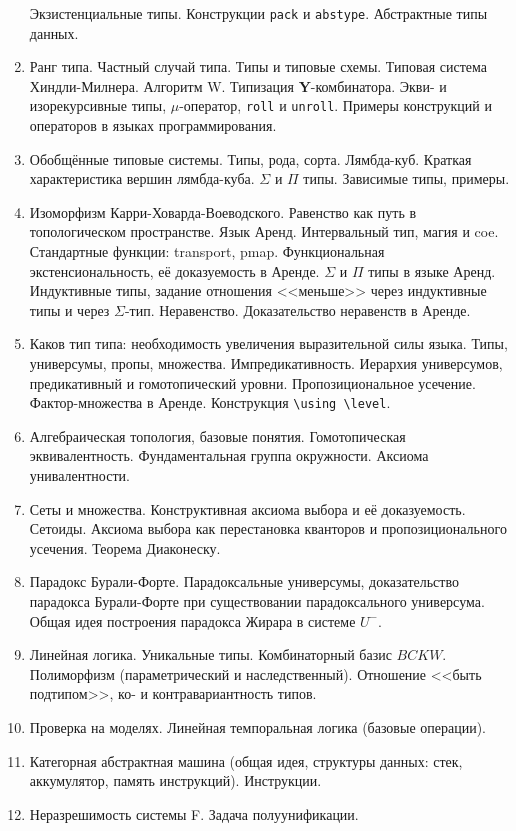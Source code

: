 \documentclass[11pt,a4paper,oneside]{article}
\begin{document}
\begin{enumerate}
Экзистенциальные типы. Конструкции \texttt{pack} и \texttt{abstype}. Абстрактные типы данных. 
\item Ранг типа. Частный случай типа. Типы и типовые схемы. Типовая система Хиндли-Милнера. Алгоритм W.
Типизация \textbf{Y}-комбинатора. Экви- и изорекурсивные типы, $\mu$-оператор, \texttt{roll} и \texttt{unroll}.
Примеры конструкций и операторов в языках программирования.
\item Обобщённые типовые системы. Типы, рода, сорта. Лямбда-куб. Краткая характеристика вершин лямбда-куба. 
$\Sigma$ и $\Pi$ типы. Зависимые типы, примеры.
\item Изоморфизм Карри-Ховарда-Воеводского.
Равенство как путь в топологическом пространстве. Язык Аренд. Интервальный тип, магия и coe. 
Стандартные функции: transport, pmap. 
Функциональная экстенсиональность, её доказуемость в Аренде. $\Sigma$ и $\Pi$ типы в языке Аренд. 
Индуктивные типы, задание отношения <<меньше>> через индуктивные типы и через $\Sigma$-тип. 
Неравенство. Доказательство неравенств в Аренде.
\item Каков тип типа: необходимость увеличения выразительной силы языка.
Типы, универсумы, пропы, множества. Импредикативность. Иерархия универсумов, предикативный и гомотопический 
уровни. Пропозициональное усечение. Фактор-множества в Аренде. Конструкция \verb!\using \level!. 
\item Алгебраическая топология, базовые понятия. Гомотопическая эквивалентность. Фундаментальная группа окружности. 
Аксиома унивалентности.
\item Сеты и множества. Конструктивная аксиома выбора и её доказуемость. 
Сетоиды. Аксиома выбора как перестановка кванторов и пропозиционального усечения. 
Теорема Диаконеску. 
\item Парадокс Бурали-Форте. Парадоксальные универсумы, доказательство парадокса Бу\-ра\-ли-Форте при 
существовании парадоксального универсума. Общая идея построения парадокса Жирара в системе $U^-$.
\item Линейная логика. Уникальные типы. Комбинаторный базис $BCKW$. Полиморфизм (параметрический и наследственный).
Отношение <<быть подтипом>>, ко- и контравариантность типов.
\item Проверка на моделях. Линейная темпоральная логика (базовые операции).
\item Категорная абстрактная машина (общая идея, структуры данных: стек, аккумулятор, память инструкций). Инструкции.
\item Неразрешимость системы F. Задача полуунификации.
\end{enumerate}
\end{document}
